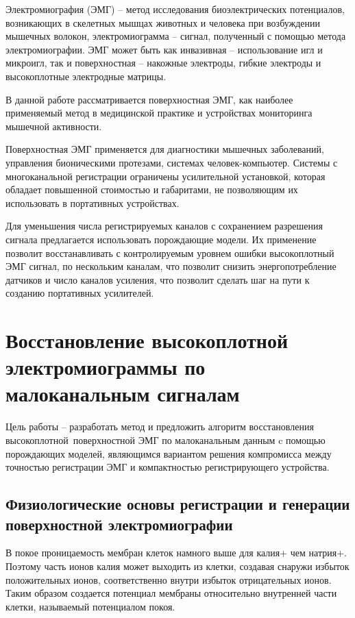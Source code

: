 \documentclass[14pt,a4paper]{extarticle}
\begin{document}
Электромиография (ЭМГ) -- метод исследования биоэлектрических
потенциалов, возникающих в скелетных мышцах животных и человека при
возбуждении мышечных волокон, электромиограмма -- сигнал, полученный с
помощью метода электромиографии. ЭМГ может быть как инвазивная --
использование игл и микроигл, так и поверхностная -- накожные электроды,
гибкие электроды и высокоплотные электродные матрицы.

В данной работе рассматривается поверхностная ЭМГ, как наиболее
применяемый метод в медицинской практике и устройствах мониторинга
мышечной активности.

Поверхностная ЭМГ применяется для диагностики мышечных заболеваний,
управления бионическими протезами, системах человек-компьютер. Системы с
многоканальной регистрации ограничены усилительной установкой, которая
обладает повышенной стоимостью и габаритами, не позволяющим их
использовать в портативных устройствах.

Для уменьшения числа регистрируемых каналов с сохранением разрешения
сигнала предлагается использовать порождающие модели. Их применение
позволит восстанавливать с контролируемым уровнем ошибки высокоплотный
ЭМГ сигнал, по нескольким каналам, что позволит снизить
энергопотребление датчиков и число каналов усиления, что позволит
сделать шаг на пути к созданию портативных усилителей.

\section{Восстановление высокоплотной электромиограммы по малоканальным сигналам}

Цель работы -- разработать метод и предложить алгоритм восстановления
высокоплотной~поверхностной ЭМГ по малоканальным данным c помощью
порождающих моделей, являющимся вариантом решения компромисса между
точностью регистрации ЭМГ и компактностью регистрирующего устройства.

\subsection{Физиологические основы регистрации и генерации поверхностной электромиографии}

В покое проницаемость мембран клеток намного выше для калия+ чем
натрия+. Поэтому часть ионов калия может выходить из клетки, создавая
снаружи избыток положительных ионов, соответственно внутри избыток
отрицательных ионов. Таким образом создается потенциал мембраны
относительно внутренней части клетки, называемый потенциалом покоя.
\end{document}
